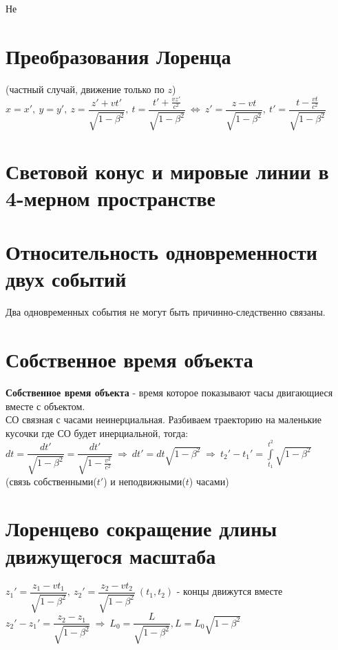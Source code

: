 \begin{multicols*}{2}
		Не
		
		\section{Преобразования Лоренца}
		
		(частный случай, движение только по $ z $) \\ 
		$ x=x',~ y=y',~ z=\dfrac{z'+vt'}{\sqrt{1-\beta^2}},~ t=\dfrac{t'+\frac{vz'}{c^2}}{\sqrt{1-\beta^2}}~\Leftrightarrow~ z'=\dfrac{z-vt}{\sqrt{1-\beta^2}},~ t'=\dfrac{t-\frac{vt}{c^2}}{\sqrt{1-\beta^2}} $
		
		\section{Световой конус и мировые линии в 4-мерном пространстве}
		
		\section{Относительность одновременности двух событий}
		
		Два одновременных события не могут быть причинно-следственно связаны.
		
		\section{Собственное время объекта}
		
		\textbf{Собственное время объекта} - время которое показывают часы двигающиеся вместе с объектом. \\
		СО  связная с часами неинерциальная. Разбиваем траекторию на маленькие кусочки где СО будет инерциальной, тогда: \\
		$ dt=\dfrac{dt'}{\sqrt{1-\beta^2}} = \dfrac{dt'}{\sqrt{1-\frac{v^2}{c^2}}} ~\Rightarrow~ dt'=dt\sqrt{1-\beta^2} ~\Rightarrow~ t_2'-t_1' = \int\limits_{t_1}^{t^2}\sqrt{1-\beta^2} $ \\
		(связь собственными($ t' $) и неподвижными($ t  $) часами)
		
		\section{Лоренцево сокращение длины движущегося масштаба}
		
		$ z_1'= \dfrac{z_1-vt_1}{\sqrt{1-\beta^2}},~ z_2'= \dfrac{z_2-vt_2}{\sqrt{1-\beta^2}} ~ (t_1,t_2)$ - концы движутся вместе \\
		$ z_2'-z_1' = \dfrac{z_2-z_1}{\sqrt{1-\beta^2}} ~ \Rightarrow ~ L_0 = \dfrac{L}{\sqrt{1-\beta^2}}, L = L_0\sqrt{1-\beta^2} $
		

\end{multicols*}
